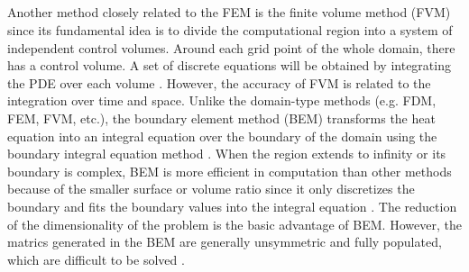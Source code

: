 \subsection{}


Another method closely related to the FEM is the finite volume method (FVM) since its fundamental idea is to divide the computational region into a system of independent control volumes. Around each grid point of the whole domain, there has a control volume. A set of discrete equations will be obtained by integrating the PDE over each volume \cite{eymard2000finite}. However, the accuracy of FVM is related to the integration over time and space. Unlike the domain-type methods
(e.g. FDM, FEM, FVM, etc.), the boundary element method (BEM) transforms the heat equation into an integral equation over the
boundary of the domain using the boundary integral equation method
\cite{attaway1991boundary}. When the region extends to infinity or its
boundary is complex, BEM is more efficient in computation than other
methods because of the smaller surface or volume ratio
\cite{katsikadelis2002boundary} since it only discretizes the boundary
and fits the boundary values into the integral equation
\cite{ang2007beginner}. The reduction of the dimensionality of the problem is the basic advantage of BEM. However, the matrics generated in the BEM are
generally unsymmetric and fully populated, which are difficult to be
solved \cite{mushtaq2010advantages}.


